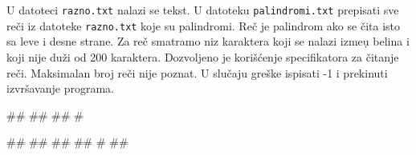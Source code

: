 \begin{Answer}[ref=p3_]
\end{Answer}


\begin{Exercise}[label=p3_]         
U datoteci \verb|razno.txt| nalazi se tekst. U datoteku
\verb|palindromi.txt| prepisati sve re\v ci iz datoteke
\verb|razno.txt| koje su palindromi. Re\v c je palindrom ako se \v
cita isto sa leve i desne strane. Za re\v c smatramo niz karaktera
koji se nalazi izme\d u belina i koji nije du\v zi od 200
karaktera. Dozvoljeno je kori\v s\'cenje specifikatora za \v citanje
re\v ci. Maksimalan broj re\v ci nije poznat. U slu\v caju gre\v ske
ispisati -1 i prekinuti izvr\v savanje programa. \\
\begin{miditest}
\begin{upotreba}{1}
##
##
##
#
\end{upotreba}
\end{miditest}
\begin{miditest}
\begin{upotreba}{2}
##
##
##
##
#
##
\end{upotreba}
\end{miditest}
\end{Exercise}
\begin{Answer}[ref=p3_]
\end{Answer}


